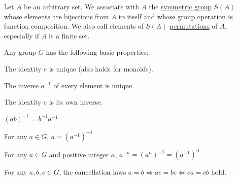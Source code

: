\begin{definition}\label{def:symmetric_group}
  Let $A$ be an arbitrary set. We associate with $A$ the \ul{symmetric group} $S(A)$ whose elements are bijections from $A$ to itself and whose group operation is function composition. We also call elements of $S(A)$ \ul{permutations} of $A$, especially if $A$ is a finite set.
\end{definition}

\begin{proposition}\label{def:group_properties}
  Any group $G$ has the following basic properties:
  \begin{defenum}
    \item\label{def:group_properties/unique_identity} The identity $e$ is unique (also holds for monoids).
    \item\label{def:group_properties/unique_inverse} The inverse $a^{-1}$ of every element is unique.
    \item\label{def:group_properties/identity_inverse} The identity $e$ is its own inverse.
    \item\label{def:group_properties/inverse_composition} $(ab)^{-1} = b^{-1} a^{-1}$.
    \item\label{def:group_properties/double_inverse} For any $a \in G$, $a = (a^{-1})^{-1}$
    \item\label{def:group_properties/negative_power} For any $a \in G$ and positive integer $n$, $a^{-n} = (a^n)^{-1} = (a^{-1})^n$
    \item\label{def:group_properties/cancellation} For any $a, b, c \in G$, the cancellation laws $a = b \iff ac = bc \iff ca = cb$ hold.
  \end{defenum}
\end{proposition}
